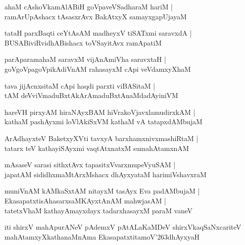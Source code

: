 \documentclass[twoside,12pt,openright]{book}
\def\S{\char'263}
\newcounter{shloka}[chapter]
\begin{document}
\begin{shloka}%
ahaM cAshoVkamAlABiH goVpaveVSadharaM hariM |\\
ramArUpAshacx tAsasxrAvx BakAtxyX samayxgapUjayaM 
\end{shloka}

\begin{shloka}%
tataH parxBaqti ceYtAsAM madheyxV tiSATxmi saravxdA |\\
BUSABiviRvidhABishacx toVSayitAvx ramApatiM 
\end{shloka}

\begin{shloka}%
parAparamahaM saravxM vijAnAmiVha saravxtaH |\\
goVgoVpagoVpikAdiVnAM rahasayxM cApi veVdamxyXhaM 
\end{shloka}

\begin{shloka}%
tava jijAcnxsitaM cApi haqdi parxti viBASitaM |\\
tAM deVviVmaduBxtAkArAmaduBxtAnaMdadAyiniVM 
\end{shloka}

\begin{shloka}%
hareVH pirxyAM hiraNAyxBAM hiVrakoVjavxlamudirxkAM |\\
kathaM pashAyxmi loVlAkiSxVM kathaM vA tatapxdAMbujaM 
\end{shloka}

\begin{shloka}%
ArAdhayxteV BaketxyXVti tavxyA barxhamxnivxmashiRtaM |\\
tatarx teV kathayiSAyxmi vaqtAtxnatxM sumahAtamxnAM 
\end{shloka}

\begin{shloka}%
mAsaseV sarasi sithxtAvx tapasitxVvarxmupeVyuSAM |\\
japatAM sididhxmaMtArxMshacx dhAyxyataM harimiVshavxraM 
\end{shloka}

\begin{shloka}%
muniVnAM kAMkaSxtAM nitayxM tasAyx Eva padAMbujaM |\\
EkasapatxtisAhasarxsaMKAyxtAnAM mahwjasAM |\\
tatetxVhaM kathayAmayxdayx tadarxhasayxM paraM vaneV 
\end{shloka}

\begin{center}
iti shirxV mahApurANeV pAdemxV pAtALaKaMDeV shirxVkaqSaNxcariteV  
 mahAtamxyXkathanaMnAma EkasapatxtitamoV\S dhAyxyaH
\end{center}
\end{document}
